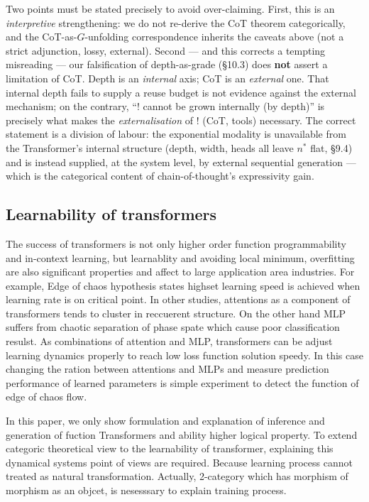 \documentclass[a4paper,11pt]{article}
\begin{document}
Two points must be stated precisely to avoid over-claiming. First, this is an \emph{interpretive} strengthening: we do not re-derive the CoT
theorem categorically, and the CoT-as-\(G\)-unfolding correspondence inherits the caveats above (not a strict adjunction, lossy, external).
Second --- and this corrects a tempting misreading --- our falsification of depth-as-grade (§10.3) does \textbf{not} assert a limitation of CoT.
Depth is an \emph{internal} axis; CoT is an \emph{external} one. That internal depth fails to supply a reuse budget is not evidence against
the external mechanism; on the contrary, ``\(!\) cannot be grown internally (by depth)'' is precisely what makes the
\emph{externalisation} of \(!\) (CoT, tools) necessary. The correct statement is a division of labour: the exponential modality is
unavailable from the Transformer's internal structure (depth, width, heads all leave \(n^*\) flat, §9.4) and is instead supplied, at the
system level, by external sequential generation --- which is the categorical content of chain-of-thought's expressivity gain.

\hypertarget{learnability-of-transformers}{%
\subsection{Learnability of transformers}\label{learnability-of-transformers}}

The success of transformers is not only higher order function programmability and in-context learning, but learnablity and avoiding
local minimum, overfitting are also significant properties and affect to large application area industries. For example, Edge of chaos hypothesis
states highset learning speed is achieved when learning rate is on critical point\cite{EoC}. In other studies, attentions as a component of transformers tends to cluster in reccuerent
structure\cite{KuramotoTransformer}. On the other hand MLP suffers from
chaotic separation of phase spate\cite{MagicNumber7} which cause poor
classification resulst. As combinations of attention and MLP,
transformers can be adjust learning dynamics properly to reach low loss
function solution speedy. In this case changing the ration between
attentions and MLPs and measure prediction performance of learned
parameters is simple experiment to detect the function of edge of chaos flow\cite{EoC}.

In this paper, we only show formulation and explanation of inference and generation of fuction Transformers and ability higher logical property.
To extend categoric theoretical view to the learnability of transformer, explaining this dynamical systems point of views are required. Because learning process cannot treated as natural transformation. Actually, 2-category which has morphism of morphism as an objcet, is nesesssary to explain training process.
\end{document}

